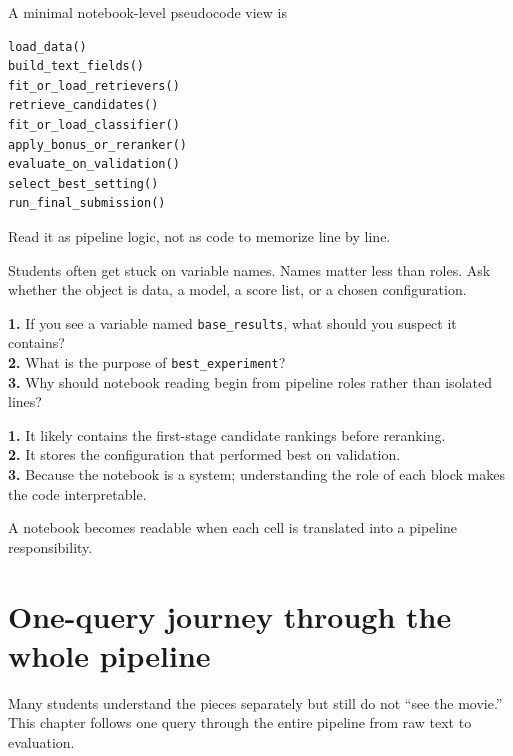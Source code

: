\documentclass[11pt,oneside]{report}
\newcommand{\code}[1]{\texttt{#1}}
\begin{document}
\begin{formulabox}
A minimal notebook-level pseudocode view is
\begin{lstlisting}
load_data()
build_text_fields()
fit_or_load_retrievers()
retrieve_candidates()
fit_or_load_classifier()
apply_bonus_or_reranker()
evaluate_on_validation()
select_best_setting()
run_final_submission()
\end{lstlisting}
Read it as pipeline logic, not as code to memorize line by line.
\end{formulabox}

\begin{warningbox}
Students often get stuck on variable names. Names matter less than roles. Ask whether the object is data, a model, a score list, or a chosen configuration.
\end{warningbox}

\begin{selfcheckbox}
\textbf{1.} If you see a variable named \code{base\_results}, what should you suspect it contains?\\
\textbf{2.} What is the purpose of \code{best\_experiment}?\\
\textbf{3.} Why should notebook reading begin from pipeline roles rather than isolated lines?
\end{selfcheckbox}

\begin{answerbox}
\textbf{1.} It likely contains the first-stage candidate rankings before reranking.\\
\textbf{2.} It stores the configuration that performed best on validation.\\
\textbf{3.} Because the notebook is a system; understanding the role of each block makes the code interpretable.
\end{answerbox}

\begin{rememberbox}
A notebook becomes readable when each cell is translated into a pipeline responsibility.
\end{rememberbox}


\chapter[One Query Through the Pipeline]{One-query journey through the whole pipeline}

\begin{purposebox}
Many students understand the pieces separately but still do not ``see the movie.'' This chapter follows one query through the entire pipeline from raw text to evaluation.
\end{purposebox}
\end{document}
